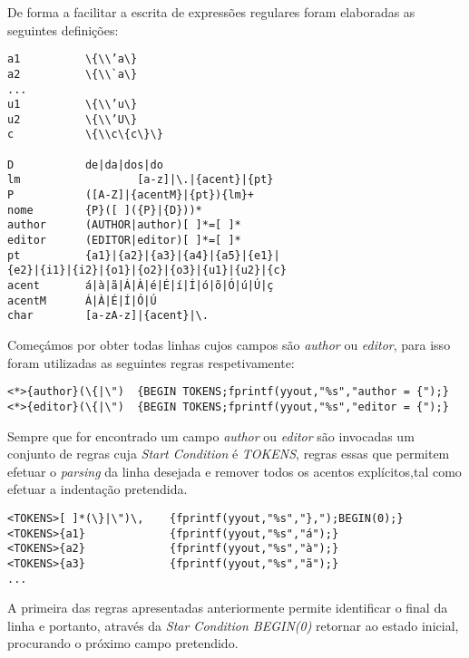De forma a facilitar a escrita de expressões regulares foram elaboradas as seguintes definições:
\begin{center}
\begin{minipage}{8cm}
\begin{verbatim}
a1 	        \{\\’a\}
a2 	        \{\\`a\}
...
u1 	        \{\\’u\}
u2 	        \{\\’U\}
c           \{\\c\{c\}\}

D           de|da|dos|do
lm 			        [a-z]|\.|{acent}|{pt}
P           ([A-Z]|{acentM}|{pt}){lm}+
nome        {P}([ ]({P}|{D}))*  
author      (AUTHOR|author)[ ]*=[ ]*
editor      (EDITOR|editor)[ ]*=[ ]*
pt          {a1}|{a2}|{a3}|{a4}|{a5}|{e1}|
{e2}|{i1}|{i2}|{o1}|{o2}|{o3}|{u1}|{u2}|{c}
acent       á|à|ã|Á|À|é|É|í|Í|ó|õ|Ó|ú|Ú|ç
acentM      Á|À|É|Í|Ó|Ú      
char        [a-zA-z]|{acent}|\.
\end{verbatim}
\end{minipage}
\end{center}

\newpage

Começámos por obter todas linhas cujos campos são \emph{author} ou \emph{editor}, para isso foram utilizadas as seguintes regras respetivamente:
\begin{verbatim}
<*>{author}(\{|\")  {BEGIN TOKENS;fprintf(yyout,"%s","author = {");}
<*>{editor}(\{|\")  {BEGIN TOKENS;fprintf(yyout,"%s","editor = {");}
\end{verbatim}

Sempre que for encontrado um campo \emph{author} ou \emph{editor} são invocadas um conjunto de regras cuja \emph{Start Condition} é \emph{TOKENS}, regras essas que permitem efetuar o \emph{parsing} da linha desejada e remover todos os acentos explícitos,tal como efetuar a indentação pretendida.
\begin{verbatim}
<TOKENS>[ ]*(\}|\")\,    {fprintf(yyout,"%s","},");BEGIN(0);}
<TOKENS>{a1}             {fprintf(yyout,"%s","á");}
<TOKENS>{a2}             {fprintf(yyout,"%s","à");}
<TOKENS>{a3}             {fprintf(yyout,"%s","ã");}
...
\end{verbatim}

A primeira das regras apresentadas anteriormente permite identificar o final da linha e portanto, através da \emph{Star Condition BEGIN(0)} retornar ao estado inicial, procurando o próximo campo pretendido.

